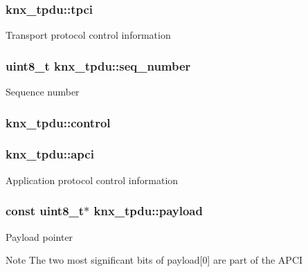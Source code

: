 \subsubsection[{\texorpdfstring{tpci}{tpci}}]{ knx\+\_\+tpdu\+::tpci}\hypertarget{structknx__tpdu_ac7420f748442fdfd7bfeff18b5303614}{}\label{structknx__tpdu_ac7420f748442fdfd7bfeff18b5303614}
Transport protocol control information 
\subsubsection[{\texorpdfstring{seq\+\_\+number}{seq_number}}]{\setlength{\rightskip}{0pt plus 5cm}uint8\+\_\+t knx\+\_\+tpdu\+::seq\+\_\+number}\hypertarget{structknx__tpdu_a6550220aae73dde64314cab49b83f27c}{}\label{structknx__tpdu_a6550220aae73dde64314cab49b83f27c}
Sequence number 
\subsubsection[{\texorpdfstring{control}{control}}]{ knx\+\_\+tpdu\+::control}\hypertarget{structknx__tpdu_ae90e15aae00f9581fb487af4dfa2f8f0}{}\label{structknx__tpdu_ae90e15aae00f9581fb487af4dfa2f8f0}
\subsubsection[{\texorpdfstring{apci}{apci}}]{ knx\+\_\+tpdu\+::apci}\hypertarget{structknx__tpdu_a6e337499867cdf5a71636ca286677916}{}\label{structknx__tpdu_a6e337499867cdf5a71636ca286677916}
Application protocol control information 
\subsubsection[{\texorpdfstring{payload}{payload}}]{\setlength{\rightskip}{0pt plus 5cm}const uint8\+\_\+t$\ast$ knx\+\_\+tpdu\+::payload}\hypertarget{structknx__tpdu_a13ab4255465e6196814ec91bb39eb193}{}\label{structknx__tpdu_a13ab4255465e6196814ec91bb39eb193}
Payload pointer \begin{DoxyNote}{Note}
The two most significant bits of {\ttfamily payload\mbox{[}0\mbox{]}} are part of the A\+P\+CI 
\end{DoxyNote}
